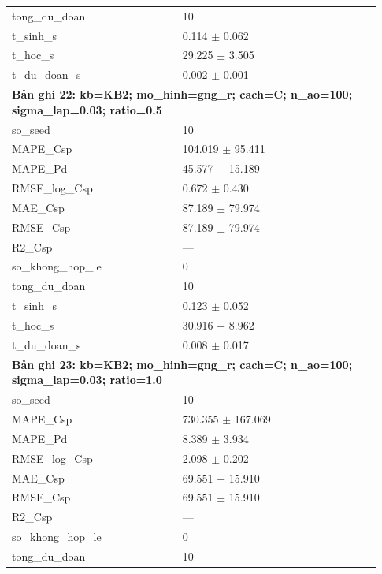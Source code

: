 \begin{longtable}{p{0.43\linewidth}p{0.50\linewidth}}
tong\_\allowbreak du\_\allowbreak doan & 10 \\
t\_\allowbreak sinh\_\allowbreak s & 0.114 $\pm$ 0.062 \\
t\_\allowbreak hoc\_\allowbreak s & 29.225 $\pm$ 3.505 \\
t\_\allowbreak du\_\allowbreak doan\_\allowbreak s & 0.002 $\pm$ 0.001 \\
\midrule
\multicolumn{2}{p{0.95\linewidth}}{\textbf{Bản ghi 22: kb=KB2; mo\_hinh=gng\_r; cach=C; n\_ao=100; sigma\_lap=0.03; ratio=0.5}} \\
so\_\allowbreak seed & 10 \\
MAPE\_\allowbreak Csp & 104.019 $\pm$ 95.411 \\
MAPE\_\allowbreak Pd & 45.577 $\pm$ 15.189 \\
RMSE\_\allowbreak log\_\allowbreak Csp & 0.672 $\pm$ 0.430 \\
MAE\_\allowbreak Csp & 87.189 $\pm$ 79.974 \\
RMSE\_\allowbreak Csp & 87.189 $\pm$ 79.974 \\
R2\_\allowbreak Csp & — \\
so\_\allowbreak khong\_\allowbreak hop\_\allowbreak le & 0 \\
tong\_\allowbreak du\_\allowbreak doan & 10 \\
t\_\allowbreak sinh\_\allowbreak s & 0.123 $\pm$ 0.052 \\
t\_\allowbreak hoc\_\allowbreak s & 30.916 $\pm$ 8.962 \\
t\_\allowbreak du\_\allowbreak doan\_\allowbreak s & 0.008 $\pm$ 0.017 \\
\midrule
\multicolumn{2}{p{0.95\linewidth}}{\textbf{Bản ghi 23: kb=KB2; mo\_hinh=gng\_r; cach=C; n\_ao=100; sigma\_lap=0.03; ratio=1.0}} \\
so\_\allowbreak seed & 10 \\
MAPE\_\allowbreak Csp & 730.355 $\pm$ 167.069 \\
MAPE\_\allowbreak Pd & 8.389 $\pm$ 3.934 \\
RMSE\_\allowbreak log\_\allowbreak Csp & 2.098 $\pm$ 0.202 \\
MAE\_\allowbreak Csp & 69.551 $\pm$ 15.910 \\
RMSE\_\allowbreak Csp & 69.551 $\pm$ 15.910 \\
R2\_\allowbreak Csp & — \\
so\_\allowbreak khong\_\allowbreak hop\_\allowbreak le & 0 \\
tong\_\allowbreak du\_\allowbreak doan & 10 \\

\end{longtable}

